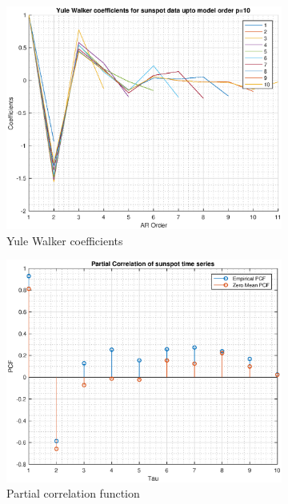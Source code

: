 \documentclass{article}
\begin{document}
\begin{figure}[h!]
\centering
\begin{subfigure}{0.32\textwidth}
\centering
\includegraphics[width = \textwidth]{yulewalker}
\caption{Yule Walker coefficients}
\label{fig:yulewalker}
\end{subfigure}
\begin{subfigure}{0.32\textwidth}
\centering
\includegraphics[width = \textwidth]{pcf}
\caption{Partial correlation function}
\label{fig:pcf}
\end{subfigure}
\label{yule_pcf}
\caption{}
\end{figure}
\end{document}
